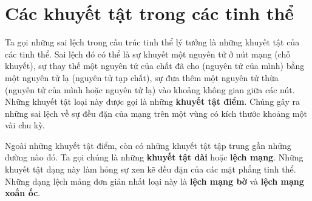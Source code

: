 
\section{Các khuyết tật trong các tinh thể}\label{sec:13_4}


Ta gọi những sai lệch trong cấu trúc tinh thể lý tưởng là những khuyết tật của các tinh thể. Sai lệch đó có thể là sự khuyết một nguyên tử ở nút mạng (chỗ khuyết), sự thay thế một nguyên tử của chất đã cho (nguyên tử của mình) bằng một nguyên tử lạ (nguyên tử tạp chất), sự đưa thêm một nguyên tử thừa (nguyên tử của mình hoặc nguyên tử lạ) vào khoảng không gian giữa các nút. Những khuyết tật loại này được gọi là những \textbf{khuyết tật điểm}. Chúng gây ra những sai lệch về sự đều đặn của mạng trên một vùng có kích thước khoảng một vài chu kỳ.


Ngoài những khuyết tật điểm, còn có những khuyết tật tập trung gần những đường nào đó. Ta gọi chúng là những \textbf{khuyết tật dài} hoặc \textbf{lệch mạng}. Những khuyết tật dạng này làm hỏng sự xen kẽ đều đặn của các mặt phẳng tinh thể. Những dạng lệch mảng đơn giản nhất loại này là  \textbf{lệch mạng bờ} và \textbf{lệch mạng xoắn ốc}.


